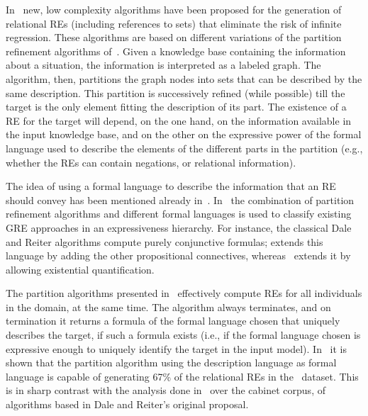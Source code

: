 In~\cite{arec2:2008:Areces,arec:usin11} new, low complexity algorithms have been proposed for the generation 
of relational REs (including references to sets) that eliminate the risk of infinite regression. 
These algorithms are based on different variations of the partition refinement algorithms of~\cite{paig:thre87}.
Given a knowledge base containing the information about a situation, the information is 
interpreted as a labeled graph.  The algorithm, then, partitions the graph nodes into sets that can 
be described by the same description.  This partition is successively refined (while possible) till the target 
is the only element fitting the description of its part.  The existence of a RE for the target will 
depend, on the one hand, on the information available in the input knowledge base, and on the other 
on the expressive power of the formal language used to describe the elements of the different 
parts in the partition (e.g., whether the REs can contain negations, or relational information). 

The idea of using a formal language to describe the information that an RE should convey has been mentioned
already in~\cite{Krahmer2003,gardent07:_gener_bridg_defin_descr}.  In~\cite{arec2:2008:Areces,arec:usin11} the 
combination of partition refinement algorithms and different formal languages is used to classify existing 
GRE approaches in an expressiveness hierarchy.  For instance, the classical Dale and Reiter algorithms
compute purely conjunctive formulas; \cite{deemter02:_gener_refer_expres} extends this language by
adding the other propositional connectives, whereas~\cite{dale91:_gener_refer_expres_invol_relat} extends it by
allowing existential quantification.

The partition algorithms presented in~\cite{arec2:2008:Areces,arec:usin11} effectively
compute REs for all individuals in the domain, at the same time.  The algorithm always terminates, and on termination it returns a formula of 
the formal language chosen that uniquely describes the target, if such a formula exists (i.e., if the 
formal language chosen is expressive enough to uniquely identify the target in the input model). In~\cite{arec2:2008:Areces}
it is shown that the partition algorithm using the description language \el as formal language is capable of generating 67\% of 
the relational REs in the~\cite{viethen06:_algor_for_gener_refer_expres} dataset. This is in sharp contrast with the analysis 
done in~\cite{viethen06:_algor_for_gener_refer_expres} over the cabinet corpus, of algorithms based in Dale and Reiter's original proposal.    

